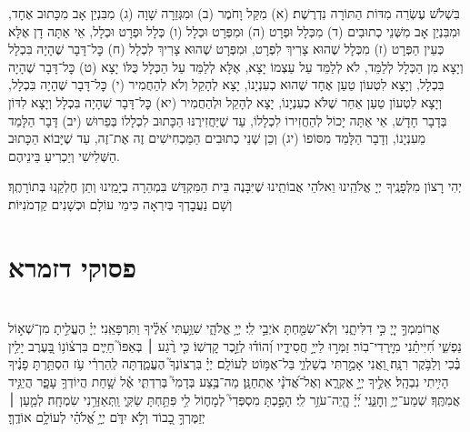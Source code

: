 \documentclass[twoside, openany, parskip=half, 11pt]{book}
\begin{document}
בִּשְׁלֹשׁ עֶשְׂרֵה מִדּוֹת הַתּוֹרָה נִדְרֶשֶׁת׃\hfill \break
(א) מִקַּל וָחֹמֶר (ב) וּמִגְּזֵרָה שָׁוָה (ג) מִבִּנְיַן אָב מִכָּתוּב אֶחָד, וּמִבִּנְיַן אָב מִשְּׁנֵי כְתוּבִים (ד) מִכְּלָל וּפְרָט (ה) וּמִפְּרָט וּכְלָל (ו) כְּלָל וּפְרָט וּכְלָל, אֵי אַתָּה דָן אֶלָּא כְּעֵין הַפְּרָט (ז) מִכְּלָל שֶׁהוּא צָרִיךְ לִפְרָט, וּמִפְּרָט שֶׁהוּא צָרִיךְ לִכְלָל (ח) כׇּל־דָּבָר שֶׁהָיָה בִּכְלָל וְיָצָא מִן הַכְּלָל לְלַמֵּד, לֹא לְלַמֵּד עַל עַצְמוֹ יָצָא, אֶלָּא לְלַמֵּד עַל הַכְּלָל כֻּלּוֹ יָצָא (ט) כׇּל־דָּבָר שֶׁהָיָה בִּכְלָל, וְיָצָא לִטְעוֹן טַעַן אֶחָד שֶׁהוּא כְעִנְיָנוֹ, יָצָא לְהָקֵל וְלֹא לְהַחֲמִיר (י) כׇּל־דָּבָר שֶׁהָיָה בִּכְלָל, וְיָצָא לִטְעוֹן טַעַן אַחֵר שֶׁלֹּא כְעִנְיָנוֹ, יָצָא לְהָקֵל וּלְהַחֲמִיר (יא) כׇּל־דָּבָר שֶׁהָיָה בִּכְלָל וְיָצָא לִדּוֹן בְּדָבָר חָדָשׁ, אֵי אַתָּה יָכוֹל לְהַחֲזִירוֹ לִכְלָלוֹ, עַד שֶׁיַּחֲזִירֶנּוּ הַכָּתוּב לִכְלָלוֹ בְּפֵרוּשׁ (יב) דָּבָר הַלָּמֵד מֵעִנְיָנוֹ, וְדָבָר הַלָּמֵד מִסּוֹפוֹ (יג) וְכֵן שְׁנֵי כְתוּבִים הַמַּכְחִישִׁים זֶה אֶת־זֶה, עַד שֶׁיָּבוֹא הַכָּתוּב הַשְּׁלִישִׁי וְיַכְרִיעַ בֵּינֵיהֶם.

יְהִי רָצוֹן מִלְּפָנֶֽיךָ יְיָ אֱלֹהֵֽינוּ וֵאלֹהֵי אֲבוֹתֵֽינוּ שֶׁיִּבָּנֶה בֵּית הַמִּקְדָּשׁ בִּמְהֵרָה בְיָמֵֽינוּ וְתֵן חֶלְקֵֽנוּ בְּתוֹרָתֶֽךָ׃ וְשָׁם נַעֲבׇדְךָ בְּיִרְאָה כִּימֵי עוֹלָם וּכְשָׁנִים קַדְמֹנִיּוֹת׃


\rabbiskaddish

\chapter[פסוקי דזמרא]{ פסוקי דזמרא }
  \\
אֲרוֹמִמְךָ֣ יְיָ֭ כִּ֣י דִלִּיתָ֑נִי וְלֹֽא־שִׂמַּ֖חְתָּ אֹיְבַ֣י לִֽי׃
יְיָ֥ אֱלֹהָ֑י \hfill שִׁוַּ֥עְתִּי אֵ֝לֶ֗יךָ וַתִּרְפָּאֵֽנִי׃
יְיָ֗ הֶעֱלִ֣יתָ מִן־שְׁא֣וֹל נַפְשִׁ֑י חִ֝יִּיתַ֗נִי מִיׇּֽרְדִי־בֽוֹר׃
זַמְּר֣וּ לַייָ֣ חֲסִידָ֑יו וְ֝הוֹד֗וּ לְזֵ֣כֶר קׇדְשֽׁוֹ׃
כִּ֤י רֶ֨גַע ׀ בְּאַפּוֹ֮ חַיִּ֢ים בִּרְצ֫וֹנ֥וֹ
בָּ֭עֶרֶב יָלִ֥ין בֶּ֗כִי וְלַבֹּ֥קֶר רִנָּֽה׃
וַ֭אֲנִי אָמַ֣רְתִּי בְשַׁלְוִ֑י בַּל־אֶמּ֥וֹט לְעוֹלָֽם׃
יְיָ֗ בִּרְצוֹנְךָ֮ הֶעֱמַ֢דְתָּה לְֽהַרְרִ֫י עֹ֥ז הִסְתַּ֥רְתָּ פָנֶ֗יךָ הָיִ֥יתִי נִבְהָֽל׃
אֵלֶ֣יךָ יְיָ֣ אֶקְרָ֑א וְאֶל־אֲ֝דֹנָ֗י אֶתְחַנָּֽן׃
מַה־בֶּ֥צַע בְּדָמִי֮ בְּרִדְתִּ֢י אֶ֫ל שָׁ֥חַת הֲיוֹדְךָ֥ עָפָ֑ר הֲיַגִּ֥יד אֲמִתֶּֽךָ׃
שְׁמַע־יְיָ֥ וְחׇנֵּ֑נִי יְ֝יָ֗ הֱֽיֵה־עֹזֵ֥ר לִֽי׃
הָפַ֣כְתָּ מִסְפְּדִי֮ לְמָח֢וֹל לִ֥י פִּתַּ֥חְתָּ שַׂקִּ֑י וַֽתְּאַזְּרֵ֥נִי שִׂמְחָֽה׃
לְמַ֤עַן ׀ יְזַמֶּרְךָ֣ כָ֭בוֹד וְלֹ֣א יִדֹּ֑ם יְיָ֥ אֱ֝לֹהַ֗י לְעוֹלָ֥ם אוֹדֶֽךָּ׃\\
\mournerskaddish
\end{document}
